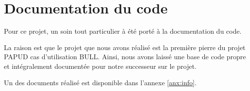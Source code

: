 \section{Documentation du code}
Pour ce projet, un soin tout particulier à été porté à la documentation du code.

La raison est que le projet que nous avons réalisé est la première pierre du projet PAPUD cas d'utilisation BULL.
Ainsi, nous avons laissé une base de code propre et intégralement documentée pour notre successeur sur le projet.

Un des documents réalisé est disponible dans l'annexe \ref{anx:info}.